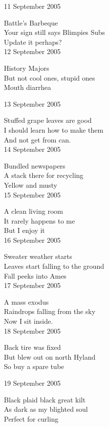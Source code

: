 \documentclass[12pt]{article}
\begin{document}
11 September 2005

Battle's Barbeque \\
Your sign still says Blimpies Subs \\
Update it perhaps? \\

12 September 2005

History Majors \\
But not cool ones, stupid ones \\
Mouth diarrhea \\

\newpage

13 September 2005

Stuffed grape leaves are good \\
I should learn how to make them \\
And not get from can. \\

14 September 2005

Bundled newspapers \\
A stack there for recycling \\
Yellow and musty \\

15 September 2005

A clean living room \\
It rarely happens to me \\
But I enjoy it \\


16 September 2005 

Sweater weather starts \\
Leaves start falling to the ground \\
Fall peeks into Ames \\

17 September 2005

A mass exodus \\
Raindrops falling from the sky \\
Now I sit inside. \\

18 September 2005

Back tire was fixed \\
But blew out on north Hyland \\
So buy a spare tube \\

\newpage

19 September 2005

Black plaid black great kilt \\
As dark as my blighted soul \\
Perfect for curling \\
\end{document}
